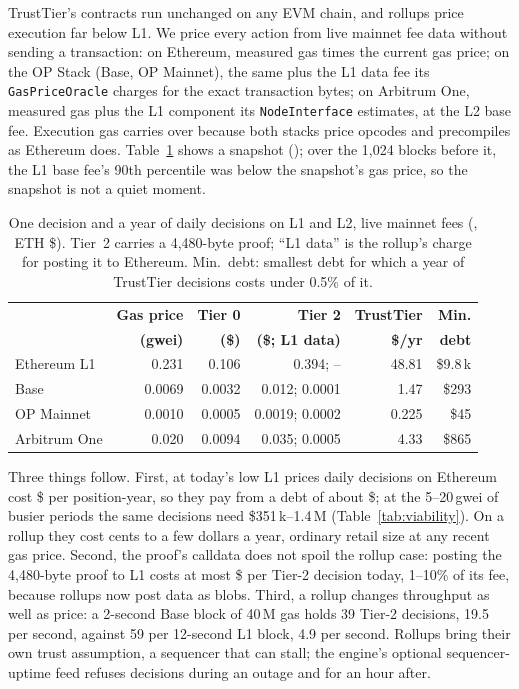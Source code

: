 \documentclass[sigconf,nonacm]{acmart}
\newcommand{\code}[1]{\texttt{\smaller #1}}
\begin{document}
TrustTier's contracts run unchanged on any EVM chain, and rollups price execution far below L1. We price every action from live mainnet fee data without sending a transaction: on Ethereum, measured gas times the current gas price; on the OP Stack (Base, OP Mainnet), the same plus the L1 data fee its \code{GasPriceOracle} charges for the exact transaction bytes; on Arbitrum One, measured gas plus the L1 component its \code{NodeInterface} estimates, at the L2 base fee. Execution gas carries over because both stacks price opcodes and precompiles as Ethereum does. Table~\ref{tab:l2} shows a snapshot (\leGasDate); over the 1,024 blocks before it, the L1 base fee's 90th percentile was below the snapshot's gas price, so the snapshot is not a quiet moment.

\begin{table}[t]
  \caption{One decision and a year of daily decisions on L1 and L2, live mainnet fees (\leGasDate, ETH \$\leEth). Tier~2 carries a 4,480-byte proof; ``L1 data'' is the rollup's charge for posting it to Ethereum. Min.\ debt: smallest debt for which a year of TrustTier decisions costs under 0.5\% of it.}
  \label{tab:l2}
  \footnotesize
  \setlength{\tabcolsep}{2.5pt}
  \begin{tabular}{@{}lrrrrr@{}}
    \toprule
    & \textbf{Gas price} & \textbf{Tier 0} & \textbf{Tier 2} & \textbf{TrustTier} & \textbf{Min.} \\
    & \textbf{(gwei)} & \textbf{(\$)} & \textbf{(\$; L1 data)} & \textbf{\$/yr} & \textbf{debt} \\
    \midrule
    Ethereum L1 & 0.231 & 0.106 & 0.394; -- & 48.81 & \$9.8\,k \\
    Base & 0.0069 & 0.0032 & 0.012; 0.0001 & 1.47 & \$293 \\
    OP Mainnet & 0.0010 & 0.0005 & 0.0019; 0.0002 & 0.225 & \$45 \\
    Arbitrum One & 0.020 & 0.0094 & 0.035; 0.0005 & 4.33 & \$865 \\
    \bottomrule
  \end{tabular}
\end{table}

Three things follow. First, at today's low L1 prices daily decisions on Ethereum cost \$\leTtLoneYr{} per position-year, so they pay from a debt of about \$\leMinDebtLone{}; at the 5--20\,gwei of busier periods the same decisions need \$351\,k--1.4\,M (Table~\ref{tab:viability}). On a rollup they cost cents to a few dollars a year, ordinary retail size at any recent gas price. Second, the proof's calldata does not spoil the rollup case: posting the 4,480-byte proof to L1 costs at most \$\leMaxLoneData{} per Tier-2 decision today, 1--10\% of its fee, because rollups now post data as blobs. Third, a rollup changes throughput as well as price: a 2-second Base block of 40\,M gas holds 39 Tier-2 decisions, 19.5 per second, against 59 per 12-second L1 block, 4.9 per second. Rollups bring their own trust assumption, a sequencer that can stall; the engine's optional sequencer-uptime feed refuses decisions during an outage and for an hour after.
\end{document}

